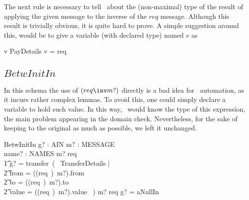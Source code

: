 

The next rule is necessary to tell \zeves\ about the (non-maximal) type of the result of
applying the given message to the inverse of the $req$ message. Although this result is trivially
obvious, it is quite hard to prove. A simple suggestion around this, would be to give a variable
(with declared type) named $v$ as
%
\begin{gzed}
    v \in PayDetails \land v = req\inv
\end{gzed}
%

\subsection*{$BetwInitIn$}

In this schema the use of $(req\inv m?)$ directly is a bad idea for \zeves\ automation,
as it incurs rather complex lemmas. To avoid this, one could simply declare a variable
to hold such value. In this way, \zeves\ would know the type of this expression, the main
problem appearing in the domain check. Nevertheless, for the sake of keeping to the original
as much as possible, we left it unchanged.
%
\begin{LSDef}
\begin{schema}{BetwInitIn}
  g? : AIN
  \also
  m? : MESSAGE
  \\    name? : NAMES
  \where
  m? \in \ran req \implies
  \\ \t1                g? = transfer~(~ \mu TransferDetails |
  \\ \t2                        from = ((req~\inv)~m?).from
  \\ \t2                        \land to = ((req~\inv)~m?).to
  \\ \t2                        \land value = ((req~\inv)~m?).value ~)
  \also
  m? \notin \ran req
  \implies
  g? = aNullIn
\end{schema}~\end{LSDef}

